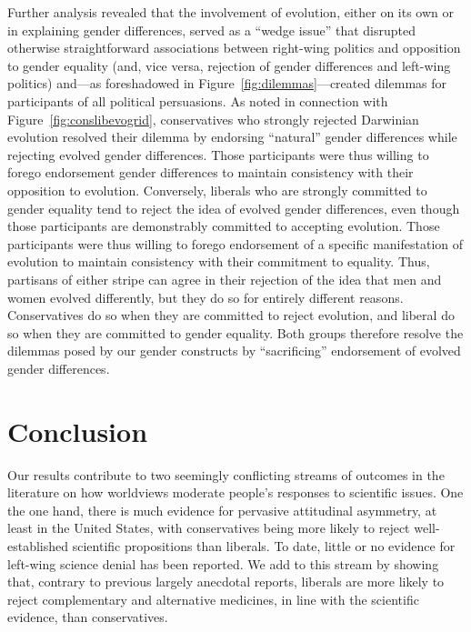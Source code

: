 \documentclass[fignum,man]{apa}\usepackage[]{graphicx}\usepackage[]{color}
\begin{document}
Further analysis revealed that the involvement of evolution, 
either on its own or in explaining
gender differences, served as a ``wedge issue'' that disrupted
otherwise straightforward associations between right-wing politics
and opposition to gender equality (and, vice versa, rejection of
gender differences and left-wing politics) and---as foreshadowed
in Figure~\ref{fig:dilemmas}---created 
dilemmas for participants of all political persuasions.
As noted in connection with
Figure~\ref{fig:conslibevogrid},
conservatives who strongly
rejected Darwinian evolution resolved their dilemma by 
endorsing 
``natural'' gender differences while rejecting
evolved gender differences. Those participants were
thus willing to forego endorsement gender differences to maintain
consistency with their opposition to evolution. 
Conversely, liberals who are strongly committed to gender equality
tend to reject the idea of evolved gender differences, even though
those participants are demonstrably committed to accepting evolution.
Those 
participants were
thus willing to forego endorsement of a specific manifestation of evolution
to maintain
consistency with their commitment to equality.
Thus, partisans of either stripe can agree in their rejection of the idea that men and
women evolved differently, but they do so for entirely different
reasons. Conservatives do so when they are committed to reject evolution, and liberal do 
so when they are committed to gender equality. Both groups therefore resolve the dilemmas
posed by our gender constructs by ``sacrificing'' endorsement of evolved gender
differences.

\section{Conclusion}
Our results contribute to two seemingly conflicting streams 
of outcomes in the literature on 
how worldviews moderate people's responses to scientific issues. 
One the one hand, there is much evidence for pervasive attitudinal
asymmetry, at least in the United States, with conservatives 
being more likely to reject
well-established scientific propositions than liberals. To date,
little or no evidence for left-wing science denial has been reported.
We add to this stream by showing that, contrary to previous largely
anecdotal reports, liberals are more likely to reject complementary
and alternative medicines, in line with the scientific evidence, than
conservatives. 
\end{document}
